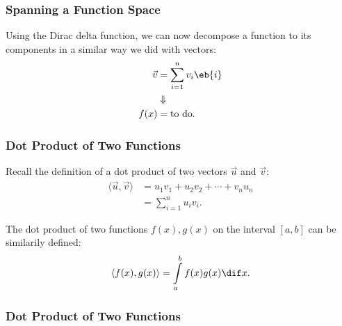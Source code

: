 \begin{frame}
	\frametitle{Spanning a Function Space}
	Using the Dirac delta function, we can now decompose a function to its components in a similar way we did with vectors:
	\begin{align*}
		\vec{v} & =\sum\limits_{i=1}^{n}v_{i}\eb{i}\\
		&\Downarrow\\
		f(x) &= \text{to do}.
	\end{align*}
\end{frame}

\begin{frame}
	\frametitle{Dot Product of Two Functions}
	Recall the definition of a dot product of two vectors $\vec{u}$ and $\vec{v}$:
	\begin{align*}
		\langle \vec{u}, \vec{v} \rangle &= u_{1}v_{1} + u_{2}v_{2} + \cdots + v_{n}u_{n}\\
		&= \sum\limits_{i=1}^{n} u_{i}v_{i}.
	\end{align*}

	The dot product of two functions $f(x), g(x)$ on the interval $\left[ a,b \right]$ can be similarily defined:
	\begin{equation*}
		\langle f(x), g(x) \rangle = \int\limits_{a}^{b} f(x)g(x) \dif x.
	\end{equation*}
\end{frame}

\begin{frame}
	\frametitle{Dot Product of Two Functions}
	\begin{presentation_note}

	\end{presentation_note}
\end{frame}

